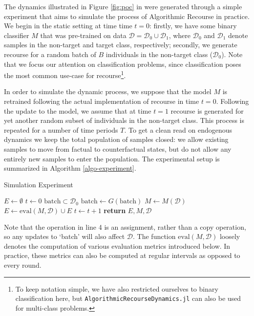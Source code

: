 \documentclass[conference,final,]{IEEEtran}
\theoremstyle{definition}
\theoremstyle{definition}
\theoremstyle{definition}
\theoremstyle{definition}
\theoremstyle{remark}
\begin{document}
The dynamics illustrated in Figure \ref{fig:poc} in were generated through a simple experiment that aims to simulate the process of Algorithmic Recourse in practice. We begin in the static setting at time time \(t=0\): firstly, we have some binary classifier \(M\) that was pre-trained on data \(\mathcal{D}=\mathcal{D}_0 \cup \mathcal{D}_1\), where \(\mathcal{D}_0\) and \(\mathcal{D}_1\) denote samples in the non-target and target class, respectively; secondly, we generate recourse for a random batch of \(B\) individuals in the non-target class (\(\mathcal{D}_0\)). Note that we focus our attention on classification problems, since classification poses the most common use-case for recourse\footnote{To keep notation simple, we have also restricted ourselves to binary classification here, but \texttt{AlgorithmicRecourseDynamics.jl} can also be used for multi-class problems.}.

In order to simulate the dynamic process, we suppose that the model \(M\) is retrained following the actual implementation of recourse in time \(t=0\). Following the update to the model, we assume that at time \(t=1\) recourse is generated for yet another random subset of individuals in the non-target class. This process is repeated for a number of time periods \(T\). To get a clean read on endogenous dynamics we keep the total population of samples closed: we allow existing samples to move from factual to counterfactual states, but do not allow any entirely new samples to enter the population. The experimental setup is summarized in Algorithm \ref{algo-experiment}.

\begin{algorithm}
\caption{Simulation Experiment}\label{algo-experiment}
\begin{algorithmic}[1]
\State $E\gets \emptyset$ 
\State $t\gets 0$
\State $\text{batch} \subset \mathcal{D}_0$ 
\State $\text{batch}\gets G(\text{batch})$ 
\State $M\gets M(\mathcal{D})$ 
\State $E\gets \text{eval}(M,\mathcal{D}) \cup E$ 
\State $t\gets t+1$ 
\EndWhile
\State \textbf{return} $E, M,\mathcal{D}$
\EndProcedure
\end{algorithmic}
\end{algorithm}

Note that the operation in line 4 is an assignment, rather than a copy operation, so any updates to `batch' will also affect \(\mathcal{D}\). The function \(\text{eval}(M,\mathcal{D})\) loosely denotes the computation of various evaluation metrics introduced below. In practice, these metrics can also be computed at regular intervals as opposed to every round.
\end{document}
